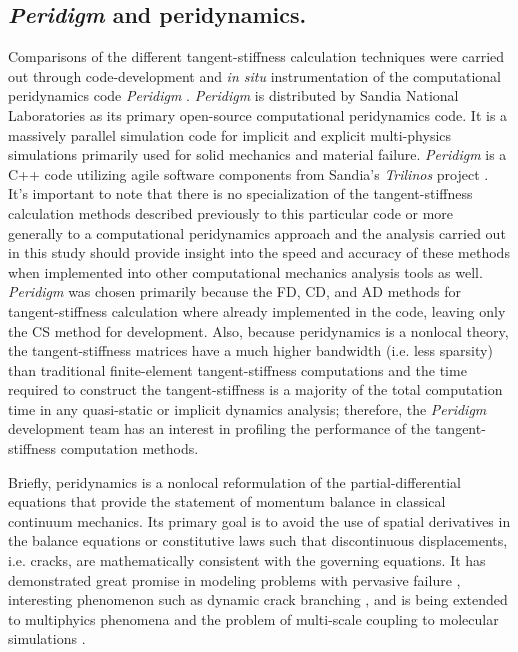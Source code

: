 \documentclass[preprint,12pt]{elsarticle}
\begin{document}
\subsection{\emph{Peridigm} and  peridynamics.}
%
Comparisons of the different tangent-stiffness calculation techniques were carried out through code-development and \emph{in situ} instrumentation of the computational peridynamics code \emph{Peridigm} \cite{peridigm}. \emph{Peridigm} is distributed by Sandia National Laboratories as its primary open-source computational peridynamics code. It is a massively parallel simulation code for implicit and explicit multi-physics simulations primarily used for solid mechanics and material failure. \emph{Peridigm} is a C++ code utilizing agile software components from Sandia's  \emph{Trilinos} project \cite{trilinos}. It's important to note that there is no specialization of the tangent-stiffness calculation methods described previously to this particular code or more generally to a computational peridynamics approach and the analysis carried out in this study should provide insight into the speed and accuracy of these methods when implemented into other computational mechanics analysis tools as well.  \emph{Peridigm} was chosen primarily because the FD, CD, and AD methods for tangent-stiffness calculation where already implemented in the code, leaving only the CS method for development. Also, because peridynamics is a nonlocal theory, the tangent-stiffness matrices have a much higher bandwidth (i.e. less sparsity) than traditional finite-element tangent-stiffness computations and the time required to construct the tangent-stiffness is a majority of the total computation time in any quasi-static or implicit dynamics analysis; therefore, the \emph{Peridigm} development team has an interest in profiling the performance of the tangent-stiffness computation methods.

Briefly, peridynamics \cite{silling2000ret,silling:psa,silling2010peridynamic} is a nonlocal reformulation of the partial-differential equations that provide the statement of momentum balance in classical continuum mechanics. Its primary goal is to avoid the use of spatial derivatives in the balance equations or constitutive laws such that discontinuous displacements, i.e. cracks, are mathematically consistent with the governing equations. It has demonstrated great promise in modeling problems with pervasive failure \cite{littlewood2010}, interesting phenomenon such as dynamic crack branching \cite{ha2010sod}, and is being extended to multiphyics phenomena \cite{bobaru2011peridynamic,katiyar2013} and the problem of multi-scale coupling to molecular simulations \cite{seleson2009peridynamics}.
\end{document}
